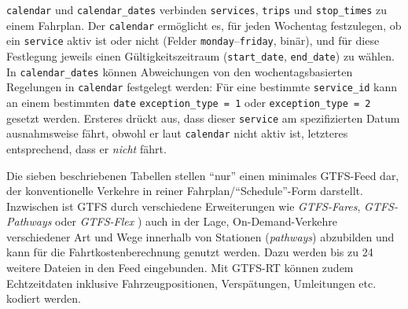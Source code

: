 \documentclass[11pt,pdftex,a4paper]{scrartcl}
\begin{document}
	\texttt{calendar} und \texttt{calendar\_dates} verbinden \texttt{services}, \texttt{trips} und \texttt{stop\_times} zu einem Fahrplan. Der \texttt{calendar} ermöglicht es, für jeden Wochentag festzulegen, ob ein \texttt{service} aktiv ist oder nicht (Felder \texttt{monday}--\texttt{friday}, binär), und für diese Festlegung jeweils einen Gültigkeitszeitraum (\texttt{start\_date}, \texttt{end\_date}) zu wählen. In \texttt{calendar\_dates} können Abweichungen von den wochentagsbasierten Regelungen in \texttt{calendar} festgelegt werden: Für eine bestimmte \texttt{service\_id} kann an einem bestimmten \texttt{date} \texttt{exception\_type = 1} oder \texttt{exception\_type = 2} gesetzt werden. Ersteres drückt aus, dass dieser \texttt{service} am spezifizierten Datum ausnahmsweise fährt, obwohl er laut \texttt{calendar} nicht aktiv ist, letzteres entsprechend, dass er \textit{nicht} fährt.
	
	Die sieben beschriebenen Tabellen stellen \enquote{nur} einen minimales GTFS-Feed dar, der konventionelle Verkehre in reiner Fahrplan/\enquote{Schedule}-Form darstellt. Inzwischen ist GTFS durch verschiedene Erweiterungen wie \textit{GTFS-Fares}, \textit{GTFS-Pathways} oder \textit{GTFS-Flex} \parencite[vgl.][]{mobilitydataGTFSExtensions2026}) auch in der Lage, On-Demand-Verkehre verschiedener Art und Wege innerhalb von Stationen (\textit{pathways}) abzubilden und kann für die Fahrtkostenberechnung genutzt werden. Dazu werden bis zu \num{24} weitere Dateien in den Feed eingebunden. Mit GTFS-RT können zudem Echtzeitdaten inklusive Fahrzeugpositionen, Verspätungen, Umleitungen etc. kodiert werden. %
	
\end{document}
